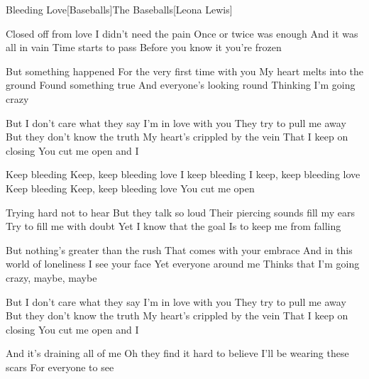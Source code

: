 \begin{Song}{Bleeding Love}[Baseballs]{The Baseballs}[Leona Lewis]
\begin{multicols}{2}
\begin{Verse}
Closed off from love
I didn't need the pain
Once or twice was enough
And it was all in vain
Time starts to pass
Before you know it you're frozen
\espaceInterStrophe

But something happened
For the very first time with you
My heart melts into the ground
Found something true
And everyone's looking round
Thinking I'm going crazy
\end{Verse}
\espaceInterStrophe

\begin{PreChorus}
But I don't care what they say
I'm in love with you
They try to pull me away
But they don't know the truth
My heart's crippled by the vein
That I keep on closing
You cut me open and I
\end{PreChorus}
\espaceInterStrophe

\begin{Chorus}
Keep bleeding
Keep, keep bleeding love
I keep bleeding
I keep, keep bleeding love
Keep bleeding
Keep, keep bleeding love
You cut me open
\end{Chorus}
\espaceInterStrophe

\begin{Verse}
Trying hard not to hear
But they talk so loud
Their piercing sounds fill my ears
Try to fill me with doubt
Yet I know that the goal
Is to keep me from falling
\columnbreak

But nothing's greater than the rush
That comes with your embrace
And in this world of loneliness
I see your face
Yet everyone around me
Thinks that I'm going crazy, maybe, maybe
\end{Verse}
\espaceInterStrophe

\begin{PreChorus}
But I don't care what they say
I'm in love with you
They try to pull me away
But they don't know the truth
My heart's crippled by the vein
That I keep on closing
You cut me open and I
\end{PreChorus}
\espaceInterStrophe

\tochorus
\espaceInterStrophe

\begin{Bridge}
And it's draining all of me
Oh they find it hard to believe
I'll be wearing these scars
For everyone to see
\end{Bridge}
\espaceInterStrophe


\end{multicols}
\end{Song}
